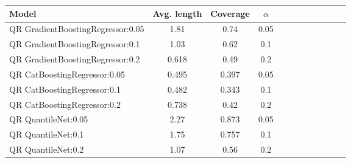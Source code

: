 \begin{table}[t] 
\centering 
\small 
\begin{tabular}{lccccccccccc} 
\toprule 
Model & Avg. length & Coverage & $\alpha$ \\ 
\midrule 
 QR GradientBoostingRegressor:0.05 & 1.81 & 0.74 & 0.05  \\ 
 QR GradientBoostingRegressor:0.1 & 1.03 & 0.62 & 0.1  \\ 
 QR GradientBoostingRegressor:0.2 & 0.618 & 0.49 & 0.2  \\ 
 QR CatBoostingRegressor:0.05 & 0.495 & 0.397 & 0.05  \\ 
 QR CatBoostingRegressor:0.1 & 0.482 & 0.343 & 0.1  \\ 
 QR CatBoostingRegressor:0.2 & 0.738 & 0.42 & 0.2  \\ 
 QR QuantileNet:0.05 & 2.27 & 0.873 & 0.05  \\ 
 QR QuantileNet:0.1 & 1.75 & 0.757 & 0.1  \\ 
 QR QuantileNet:0.2 & 1.07 & 0.56 & 0.2  \\ 
\bottomrule 
\end{tabular} 
\end{table} 
